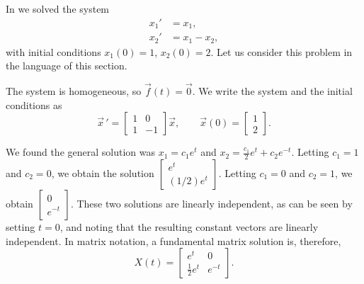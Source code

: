 \documentclass[12pt]{book}
\begin{document}
\begin{example}
In  we solved the system
\begin{align*}
x_1' & = x_1 , \\
x_2' & = x_1 - x_2 ,
\end{align*}
with initial conditions $x_1(0) = 1$, $x_2(0) = 2$.
Let us consider this problem in the language of this section.

The system is homogeneous, so $\vec{f}(t) = \vec{0}$.
We write the system and the initial conditions as
\begin{equation*}
{\vec{x}\,}'
=
\begin{bmatrix}
1 & 0 \\
1 & -1
\end{bmatrix}
\vec{x} ,
\qquad
\vec{x}(0) = 
\begin{bmatrix}
1 \\
2
\end{bmatrix} .
\end{equation*}

We found the general solution was
$x_1 = c_1 e^t $ and
$x_2 = \frac{c_1}{2}e^{t} + c_2e^{-t}$. 
Letting $c_1=1$ and $c_2=0$, we obtain the solution
$\left[ \begin{smallmatrix} e^t \\ (1/2) e^t \end{smallmatrix} \right]$.
Letting $c_1=0$ and $c_2=1$, we obtain
$\left[ \begin{smallmatrix} 0 \\ e^{-t} \end{smallmatrix} \right]$.
These two solutions are linearly independent,
as can be seen by setting
$t=0$, and noting that the resulting constant vectors are
linearly independent.
In matrix notation, a fundamental matrix solution is, therefore,
\begin{equation*}
X(t) = 
\begin{bmatrix}
e^t & 0 \\
\frac{1}{2} e^t & e^{-t}
\end{bmatrix} .
\end{equation*}


\end{example}
\end{document}
